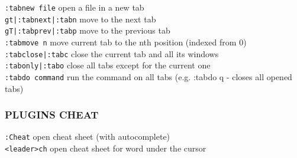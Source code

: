 \documentclass[10pt,a4paper,landscape]{article}
\begin{document}
\begin{multicols}{3}
    \colorbox{gray!20}{\lstinline{:tabnew file}}        open a file in a new tab \\
    \colorbox{gray!20}{\lstinline{gt|:tabnext|:tabn}}   move to the next tab \\
    \colorbox{gray!20}{\lstinline{gT|:tabprev|:tabp}}   move to the previous tab \\
    \colorbox{gray!20}{\lstinline{:tabmove n}}          move current tab to the nth position (indexed from 0) \\
    \colorbox{gray!20}{\lstinline{:tabclose|:tabc}}     close the current tab and all its windows \\
    \colorbox{gray!20}{\lstinline{:tabonly|:tabo}}      close all tabs except for the current one \\
    \colorbox{gray!20}{\lstinline{:tabdo command}}      run the command on all tabs (e.g. :tabdo q - closes all opened tabs) \\
    
    
    \subsubsection*{
    PLUGINS CHEAT
    }
    
    \colorbox{gray!20}{\lstinline{:Cheat}}              open cheat sheet (with autocomplete) \\
    \colorbox{gray!20}{\lstinline{<leader>ch}}          open cheat sheet for word under the cursor \\
    
\end{multicols}
\end{document}
